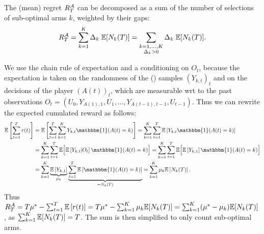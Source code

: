 \begin{proposition}\label{prop:2:RegretDecomposition}
\begin{leftbar}[propositionbar]  %
    The (mean) regret $R_T^{\mathcal{A}}$ can be decomposed as a sum of the number of selections of sub-optimal arms $k$, weighted by their gaps:
    \begin{align}\label{eq:2:RegretDecomposition}
        R_T^{\mathcal{A}} = \sum_{k=1}^K \Delta_k \; \mathbb{E}[ N_k(T) ]
        = \sum_{\substack{k=1,\dots,K\\\Delta_k > 0}} \Delta_k \; \mathbb{E}[ N_k(T) ].
    \end{align}
\end{leftbar}  %
\end{proposition}
%
\begin{smallproof}\label{proof:2:RegretDecomposition}
    We use the chain rule of expectation and a conditioning on $O_t$,
    because the expectation is taken on the randomness of the (\iid) samples $(Y_{k,t})_t$ and on the decisions of the player $(A(t))_t$, which are measurable wrt to the past observations $O_t = (U_0, Y_{A(1),1}, U_1, \dots, Y_{A(t-1),t-1}, U_{t-1})$.
    Thus we can rewrite the expected cumulated reward as follows:
    \begin{align*}
        \E \left[ \sum_{t=1}^T r(t) \right]
        &= \E \left[ \sum_{t=1}^T \sum_{k=1}^K Y_{k,t} \mathbbm{1}(A(t) = k) \right]
        = \sum_{k=1}^K \sum_{t=1}^T \E \left[ Y_{k,t} \mathbbm{1}(A(t) = k) \right] \\
        &= \sum_{k=1}^K \sum_{t=1}^T \E \Bigl[ \E \left[ Y_{k,t} | O_t \right] \mathbbm{1}(A(t) = k) \Bigr]
        = \sum_{k=1}^K \sum_{t=1}^T \E \Bigl[ \E \left[ Y_{k,1} \right] \mathbbm{1}(A(t) = k) \Bigr] \\
        &= \sum_{k=1}^K \underbrace{\E \left[ Y_{k,1} \right]}_{\mu_k} \underbrace{\sum_{t=1}^T \E \left[ \mathbbm{1}(A(t) = k) \right]}_{= N_k(T)}
        = \sum_{k=1}^K \mu_k \E \left[ N_k(T) \right].
    \end{align*}
    Thus $R_T^{\mathcal{A}} = T \mu^* - \sum_{t=1}^T \mathbb{E}\left[ r(t) \right] = T \mu^* - \sum_{k=1}^K \mu_k \mathbb{E}[ N_k(T) ] = \sum_{k=1}^K (\mu^* - \mu_k) \mathbb{E}[ N_k(T) ]$,
    as $\sum_{k=1}^K  \mathbb{E}[ N_k(T) ] = T$.
    The sum is then simplified to only count sub-optimal arms.
\end{smallproof}


